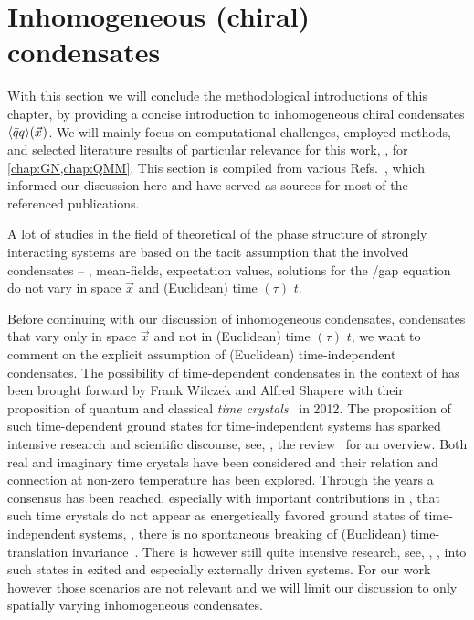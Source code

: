 \section{Inhomogeneous (chiral) condensates}\label{sec:inhomogeneousPhases}
With this section we will conclude the methodological introductions of this chapter, by providing a concise introduction to inhomogeneous chiral condensates  $\langle \bar{q} q \rangle(\vec{x}\mskip1.0mu)$.
We will mainly focus on computational challenges, employed methods, and selected literature results of particular relevance for this work, \ie{}, for \cref{chap:GN,chap:QMM}.
This section is compiled from various Refs.~\cite{Carignano:2012yli,Buballa:2014tba,Motta:2023pks,Stoll:2021ori,Koenigstein:2021llr,A03first:2016,A03second:2021}, which informed our discussion here and have served as sources for most of the referenced publications.\bigskip

A lot of studies in the field of theoretical \hep{} of the phase structure of strongly interacting systems are based on the tacit assumption that the involved condensates 
-- \ie{}, mean-fields, expectation values, solutions for the \qeom{}/gap equation \dash{} do not vary in space $\vec{x}$ and (Euclidean) time $(\tau)$ $t$.

Before continuing with our discussion of inhomogeneous condensates, \viz{} condensates that vary only in space $\vec{x}$ and not in (Euclidean) time  $(\tau)$ $t$, we want to comment on the explicit assumption of (Euclidean) time-independent condensates.
The possibility of time-dependent condensates in the context of \hep{} has been brought forward by Frank Wilczek and Alfred Shapere with their proposition of quantum and classical \textit{time crystals}~\cite{Wilczek:2012jt,Shapere:2012nq} in 2012. 
The proposition of such time-dependent ground states for time-independent systems has sparked intensive research and scientific discourse, see, \eg{}, the review~\cite{Sacha:2017fqe} for an overview.
Both real and imaginary time crystals have been considered and their relation and connection at non-zero temperature has been explored.
Through the years a consensus has been reached, especially with important contributions in , that such time crystals do not appear as energetically favored ground states of time-independent systems, \ie{}, there is no spontaneous breaking of (Euclidean) time-translation invariance~\cite{Sacha:2017fqe}.
There is however still quite intensive research, see, \eg{}, , into such states in exited and especially externally driven systems. 
For our work however those scenarios are not relevant and we will limit our discussion to only spatially varying inhomogeneous condensates.

